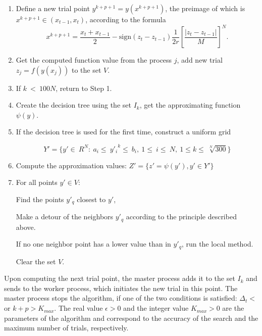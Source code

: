 \documentclass{svproc}
\begin{document}
\begin{enumerate}
	
	\item Define a new trial point $y^{k+p+1}=y\left(x^{k+p+1}\right)$, the preimage of which is  $x^{k+p+1}\in\left(x_{t-1},x_t\right)$, according to the formula 
\begin{displaymath}
	x^{k+p+1}=\frac{x_t+x_{t-1}}{2}-\mathrm{sign}\left(z_t-z_{t-1}\right)\frac{1}{2r}\left[\frac{\left|z_t-z_{t-1}\right|}{M}\right]^N.
\end{displaymath}
	
	
	\item Get the computed function value from the process $j$, add new trial $z_j = f(y(x_j))$ to the set  $V$. 
	
	
	\item If $k\ <\ 100 N$, return to Step 1.
	
	
	\item Create the decision tree using the set $I_k$, get the approximating function $\psi(y)$.
	
	\item If the decision tree is used for the first time, construct a uniform grid 
	
	\begin{displaymath} 
		Y'=\{ y'\in\ R^N:\ a_i\le\  {y'_i}^k \le\ b_i,\ 1\le\ i\le\ N,\ 1\le k\le\ \sqrt[N]{300}  \} 
	\end{displaymath} 
	
	
	\item Compute the approximation values: $Z' = \{ z'=  \psi(y'), y' \in Y'\}$
	
	\item For all points $y'\in V$:
	
	Find the points $y'_q$ closest to $y'$,
	
	Make a detour of the neighbors $y'_q$ according to the principle described above.
	
	If no one neighbor point has a lower value than in $y'_q$, run the local method.
	
	Clear the set $V$.
	
\end{enumerate}

Upon computing the next trial point, the master process adds it to the set $I_k$ and sends to the  worker process, which initiates the new trial in this point. The master process stops the algorithm, if one of the two conditions is satisfied: $\Delta_t<$ or  $k+p>K_{max}$. The real value $\epsilon>0$ and the integer value $K_{max}>0$ are the parameters of the algorithm  and correspond to the accuracy of the search and the maximum number of trials, respectively.
\end{document}
